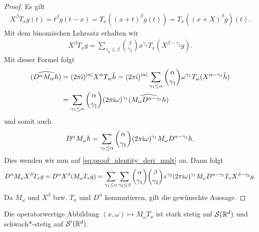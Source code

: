 \begin{proof}
	Es gilt
	\begin{align*}
	X^\beta T_x g(t)
	=
	t^\beta g(t-x)
	=
	T_x ((x+t)^\beta g(t))
	=
	T_x ((x+X)^\beta g)(t).
	\end{align*}
	Mit dem binomischen Lehrsatz erhalten wir
	\begin{align}\label{eq:proof_identity_deri_mult}
	X^\beta T_x g  
	=
	\sum 
	\limits_{\gamma_2 \leq \beta}
	\binom{\beta}{\gamma_2}
	x^{\gamma_2} T_x (X^{\beta - \gamma_2} g).
	\end{align}
	Mit dieser Formel folgt
	\begin{align*}
	\widehat{(D^\alpha M_w  h)}
	&=(2\pi \textrm{i})^{|\alpha|}
	X^\alpha T_w \hat{h}
	=
	(2\pi \textrm{i})^{|\alpha|}
	\sum \limits_{\gamma_1 \leq \alpha}
	\binom{\alpha}{\gamma_1} \omega^{\gamma_1}T_\omega (X^{\alpha - \gamma_1} \hat{h})\\
	&=
	\sum \limits_{\gamma_1 \leq \alpha}
	\binom{\alpha}{\gamma_1} (2\pi \textrm{i} \omega)^{\gamma_1} \widehat{(M_\omega D^{\alpha - \gamma_1} h)} 
	\end{align*}
	und somit auch
	\begin{align}
	D^\alpha M_\omega h 
	=
	\sum \limits_{\gamma_1 \leq \alpha}
	\binom{\alpha}{\gamma_1}
	(2 \pi \textrm{i} \omega)^{\gamma_1} M_\omega D^{\alpha- \gamma_1} h.
	\end{align}
	Dies wenden wir nun auf \eqref{eq:proof_identity_deri_mult} an.
	Dann folgt
	\begin{align*}
	D^\alpha M_\omega X^\beta T_x g
	= 
	D^\alpha X^\beta(M_\omega T_x g)
	=
	\sum \limits_{\gamma_1 \leq \alpha}
	\sum \limits_{\gamma_2 \leq \beta}
	\binom{\alpha}{\gamma_1}
	\binom{\beta}{\gamma_2}
	x^{\gamma_2}
	(2 \pi \textrm{i} \omega)^{\gamma_1}
	M_\omega D^{\alpha - \gamma_1} T_x X^{\beta - \gamma_2} g.
	\end{align*}
	Da $ M_\omega $ und $ X^\beta $ bzw. $ T_x  $ und $ D^\alpha $ kommutieren, gilt die gewünschte Aussage.
\end{proof}

\begin{lem}
	Die operatorwertige Abbildung $ (x, \omega) \mapsto M_\omega T_x $
	ist stark stetig auf $ \mathcal{S}(\mathbb{R}^d) $ und schwach*-stetig auf $ \mathcal{S}^\prime(\mathbb{R}^d) $.
\end{lem}

